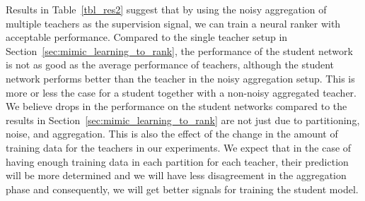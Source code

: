 Results in Table~\ref{tbl_res2} suggest that by using the noisy aggregation of multiple teachers as the supervision signal, we can train a neural ranker with acceptable performance.
%
Compared to the single teacher setup in Section~\ref{sec:mimic_learning_to_rank}, the performance of the student network is not as good as the average performance of teachers, although the student network performs better than the teacher in the noisy aggregation setup. This is more or less the case for a student together with a non-noisy aggregated teacher.
% 
We believe drops in the performance on the student networks compared to the results in Section~\ref{sec:mimic_learning_to_rank} are not just due to partitioning, noise, and aggregation. This is also the effect of the change in the amount of training data for the teachers in our experiments. We expect that in the case of having enough training data in each partition for each teacher, their prediction will be more determined and we will have less disagreement in the aggregation phase and consequently, we will get better signals for training the student model.